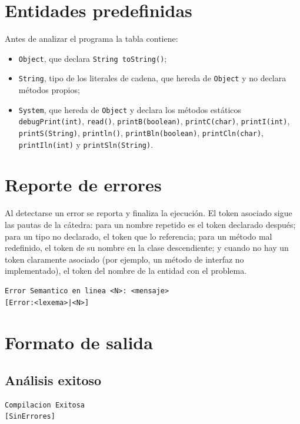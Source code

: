 \documentclass[11pt,a4paper]{article}
\begin{document}
\section{Entidades predefinidas}

Antes de analizar el programa la tabla contiene:

\begin{itemize}
  \item \texttt{Object}, que declara \texttt{String toString()};
  \item \texttt{String}, tipo de los literales de cadena, que hereda de
        \texttt{Object} y no declara métodos propios;
  \item \texttt{System}, que hereda de \texttt{Object} y declara los métodos
        estáticos \texttt{debugPrint(int)}, \texttt{read()}, \texttt{printB(boolean)},
        \texttt{printC(char)}, \texttt{printI(int)}, \texttt{printS(String)},
        \texttt{println()}, \texttt{printBln(boolean)}, \texttt{printCln(char)},
        \texttt{printIln(int)} y \texttt{printSln(String)}.
\end{itemize}

\section{Reporte de errores}

Al detectarse un error se reporta y finaliza la ejecución. El token asociado sigue
las pautas de la cátedra: para un nombre repetido es el token declarado después; para
un tipo no declarado, el token que lo referencia; para un método mal redefinido, el
token de su nombre en la clase descendiente; y cuando no hay un token claramente
asociado (por ejemplo, un método de interfaz no implementado), el token del nombre de
la entidad con el problema.

\begin{verbatim}
Error Semantico en linea <N>: <mensaje>
[Error:<lexema>|<N>]
\end{verbatim}

\section{Formato de salida}

\subsection{Análisis exitoso}

\begin{verbatim}
Compilacion Exitosa
[SinErrores]
\end{verbatim}
\end{document}
